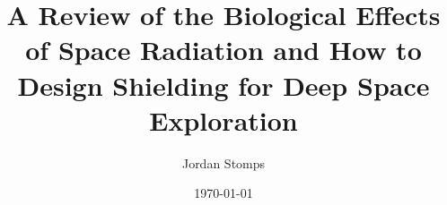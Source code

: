 \documentclass{article}
\title{A Review of the Biological Effects of Space Radiation and How to Design Shielding for Deep Space Exploration}
\date{\today}
\author{Jordan Stomps}
\begin{document}
\maketitle







\pagebreak


\end{document}

